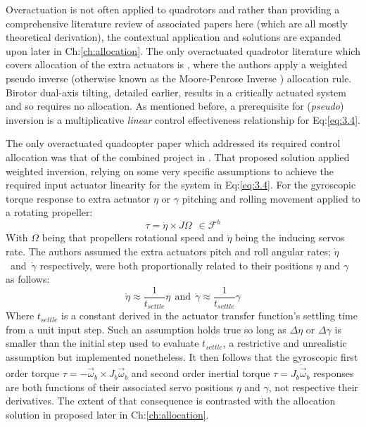 \par
Overactuation is not often applied to quadrotors and rather than providing a comprehensive literature review of associated papers here (which are all mostly theoretical derivation), the contextual application and solutions are expanded upon later in Ch:\ref{ch:allocation}. The only overactuated quadrotor literature which covers allocation of the extra actuators is \cite{tiltgasco,tiltrihani}, where the authors apply a weighted pseudo inverse (otherwise known as the Moore-Penrose Inverse \cite{moorepenrose}) allocation rule. Birotor dual-axis tilting, detailed earlier, results in a critically actuated system and so requires no allocation. As mentioned before, a prerequisite for (\emph{pseudo}) inversion is a multiplicative \emph{linear} control effectiveness relationship for Eq:\ref{eq:3.4}. 
\par
The only overactuated quadcopter paper which addressed its required control allocation was that of the combined project in \cite{tiltgasco,tiltrihani}. That proposed solution applied weighted inversion, relying on some very specific assumptions to achieve the required input actuator linearity for the system in Eq:\ref{eq:3.4}. For the gyroscopic torque response to extra actuator $\eta$ or $\gamma$ pitching and rolling movement applied to a rotating propeller:
\begin{equation}
\tau=\dot{\eta}\times J\Omega~~\in\mathcal{F}^b
\end{equation}
With $\Omega$ being that propellers rotational speed and $\dot{\eta}$ being the inducing servos rate. The authors assumed the extra actuators pitch and roll angular rates; $\dot{\eta}$~and~$\dot{\gamma}$ respectively, were both proportionally related to their positions $\eta$ and $\gamma$ as follows:
\begin{equation}
\dot{\eta}\approx \frac{1}{t_{settle}}\eta~~\text{and}~~\dot{\gamma}\approx \frac{1}{t_{settle}}\gamma
\end{equation}
Where $t_{settle}$ is a constant derived in the actuator transfer function's settling time from a unit input step. Such an assumption holds true so long as $\Delta\eta$ or $\Delta\gamma$ is smaller than the initial step used to evaluate $t_{settle}$, a restrictive and unrealistic assumption but implemented nonetheless. It then follows that the gyroscopic first order torque $\tau=-\vec{\omega}_b\times J_b\vec{\omega}_b$ and second order inertial torque $\tau=J_b\dot{\vec{\omega}}_b$ responses are both functions of their associated servo positions $\eta$ and $\gamma$, not respective their derivatives. The extent of that consequence is contrasted with the allocation solution in proposed later in Ch:\ref{ch:allocation}.
